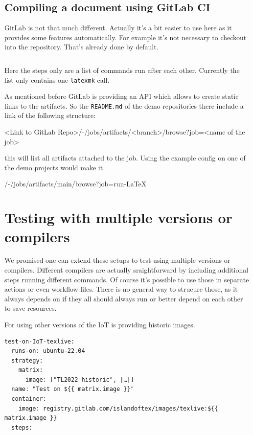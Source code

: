 \documentclass[final]{ltugboat}
\newcommand*{\TeXLive}{\acro{\TeX\,Live}}
\newcommand*{\command}[1]{\texttt{#1}}
\newcommand*{\file}[1]{\texttt{#1}}
\begin{document}
\subsection{Compiling a document using GitLab CI}

GitLab is not that much different. Actually it's a bit easier to use here as it provides some features automatically.
For example it's not necessary to checkout into the repository.
That's already done by default.

\inputminted[breaklines,breakafter=/]{yaml}{examples/latex-basic-gitlab.yml}

Here the steps only are a list of commands run after each other. Currently the list only contains one \command{latexmk} call.

As mentioned before GitLab is providing an API which allows to create static links to the artifacts.
So the \file{README.md} of the demo repositories there include a link of the following structure:

<Link to GitLab Repo>/-/jobs/artifacts/<branch>/browse?job=<name of the job>

this will list all artifacts attached to the job.
Using the example config on one of the demo projects would make it

/-/jobs/artifacts/main/browse?job=run-LaTeX

\section{Testing with multiple versions or compilers}

We promised one can extend these setups to test using multiple versions or compilers.
Different compilers are actually sraightforward by including additional steps running different commands.
Of course it's possible to use those in separate actions or even workflow files.
There is no general way to strucure those, as it always depends on if they all should always run or better depend on each other to save resources.

For using other versions of \TeXLive{} the IoT is providing historic images.

\begin{verbatim}
test-on-IoT-texlive:
  runs-on: ubuntu-22.04
  strategy:
    matrix:
      image: ["TL2022-historic", |…|]
  name: "Test on ${{ matrix.image }}"
  container:
    image: registry.gitlab.com/islandoftex/images/texlive:${{ matrix.image }}
  steps:
\end{verbatim}
\end{document}
